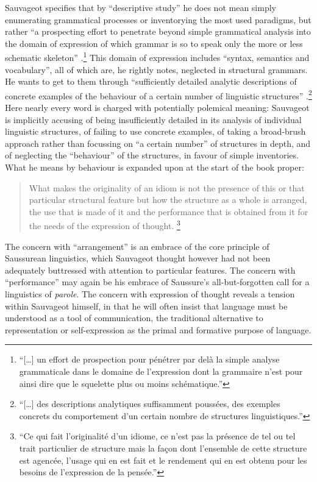 \documentclass[output=paper]{langscibook}
\begin{document}
Sauvageot specifies that by ``descriptive study'' he does not mean simply enumerating grammatical processes or inventorying the most used paradigms, but rather ``a prospecting effort to penetrate beyond simple grammatical analysis into the domain of expression of which grammar is so to speak only the more or less schematic skeleton'' \citep[7]{Sauvageot1946}.\footnote{``[…] un effort de prospection pour pénétrer par delà la simple analyse grammaticale dans le domaine de l'expression dont la grammaire n'est pour ainsi dire que le squelette plus ou moins schématique.''} This domain of expression includes ``syntax, semantics and vocabulary'', all of which are, he rightly notes, neglected in structural grammars. He wants to get to them through ``sufficiently detailed analytic descriptions of concrete examples of the behaviour of a certain number of linguistic structures'' \citep[7]{Sauvageot1946}.\footnote{``[…] des descriptions analytiques suffisamment poussées, des exemples concrets du comportement d'un certain nombre de structures linguistiques.''} Here nearly every word is charged with potentially polemical meaning: Sauvageot is implicitly accusing  of being insufficiently detailed in its analysis of individual linguistic structures, of failing to use concrete examples, of taking a broad-brush approach rather than focussing on ``a certain number'' of structures in depth, and of neglecting the ``behaviour'' of the structures, in favour of simple inventories. What he means by behaviour is expanded upon at the start of the book proper: 

\largerpage[1]\begin{quotation}
What makes the originality of an idiom is not the presence of this or that particular structural feature but how the structure as a whole is arranged, the use that is made of it and the performance that is obtained from it for the needs of the expression of thought. \citep[13]{Sauvageot1946}\footnote{``Ce qui fait l'originalité d'un idiome, ce n'est pas la présence de tel ou tel trait particulier de structure mais la façon dont l'ensemble de cette structure est agencée, l'usage qui en est fait et le rendement qui en est obtenu pour les besoins de l'expression de la pensée.''} 
\end{quotation}

The concern with ``arrangement'' is an embrace of the core principle of Saussurean linguistics, which Sauvageot thought however had not been adequately buttressed with attention to particular features. The concern with ``performance'' may again be his embrace of Saussure's all-but-forgotten call for a linguistics of \emph{parole}. The concern with expression of thought reveals a tension within Sauvageot himself, in that he will often insist that language must be understood as a tool of communication, the traditional alternative to representation or self-expression as the primal and formative purpose of language.
\end{document}
